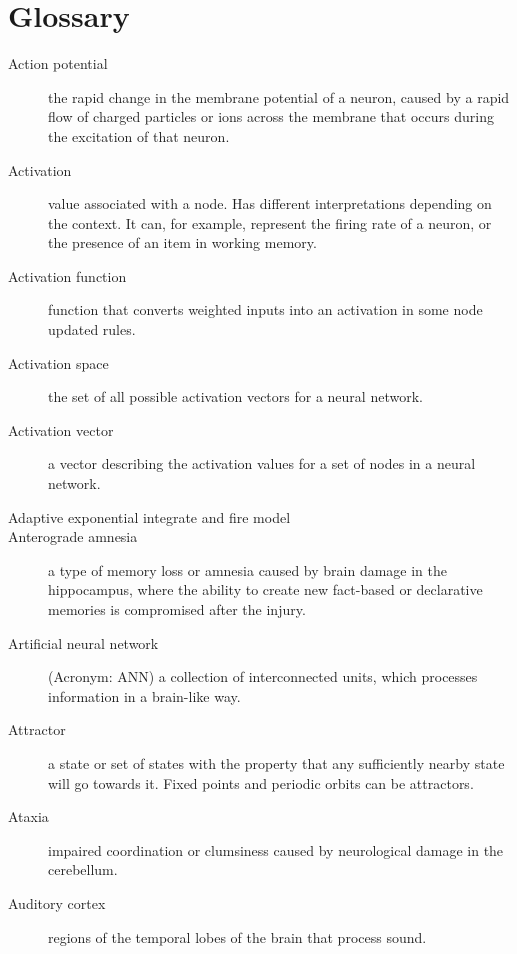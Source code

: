 \chapter{Glossary}

\begin{description}

\item[Action potential] the rapid change in the membrane potential of a neuron, caused by a rapid flow of charged particles or ions across the membrane that occurs during the excitation of that neuron.

\item[Activation] value associated with a node. Has different interpretations depending on the context. It can, for example, represent the firing rate of a neuron, or the presence of an item in working memory.

\item[Activation function] function that converts weighted inputs into an activation in some node updated rules.

\item[Activation space] the set of all possible activation vectors for a neural network.

\item[Activation vector] a vector describing the activation values for a set of nodes in a neural network.

\item[Adaptive exponential integrate and fire model]

\item[Anterograde amnesia] a type of memory loss or amnesia caused by brain damage in the hippocampus, where the ability to create new fact-based or declarative memories is compromised after the injury. 

\item[Artificial neural network] (Acronym: ANN) a collection of interconnected units, which processes information in a brain-like way.

\item[Attractor] a state or set of states with the property that any  sufficiently nearby state will go towards it. Fixed points and periodic orbits can be attractors.

\item[Ataxia] impaired coordination or clumsiness caused by neurological damage in the cerebellum.

\item[Auditory cortex] regions of the temporal lobes of the brain that process sound. 


\end{description}
